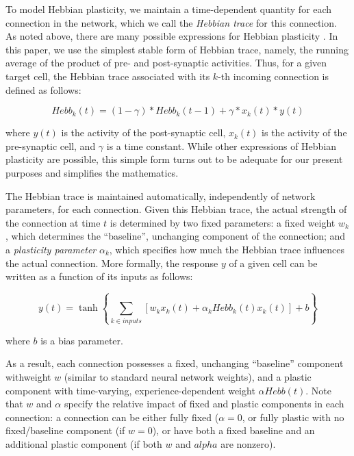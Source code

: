 \documentclass{article}
\begin{document}
To model Hebbian plasticity, we maintain a time-dependent quantity for each
connection in the network, which we call the \emph{Hebbian trace} for this
connection.  As noted above, there are many possible expressions for Hebbian
plasticity \cite{Vasilkoski2011-ww}.  In this paper, we use the simplest stable form of Hebbian trace,
namely, the running average of the product of pre- and post-synaptic
activities.  Thus, for a given target cell, the Hebbian trace associated with
its $k$-th incoming connection is defined as follows:

\begin{equation}
\label{eq:hebb}
Hebb_k(t) = (1-\gamma) * Hebb_k(t-1) + \gamma * x_k(t) * y(t)
\end{equation}

where $y(t)$ is the activity of the post-synaptic cell, $x_k(t)$ is the activity
of the pre-synaptic cell, and $\gamma$ is a time constant. While other
expressions of Hebbian plasticity are possible, this simple form turns out to be
adequate for our present purposes and simplifies the mathematics.

The Hebbian trace is maintained automatically, independently of network
parameters, for each connection. Given this Hebbian trace, the
actual strength of the connection at time $t$ is determined by two fixed parameters: a fixed
weight $w_k$, which determines the ``baseline'', unchanging component of the
connection; and a \emph{plasticity parameter} $\alpha_k$, which specifies how
much the Hebbian trace influences the actual connection. More formally, the
response $y$ of a given cell can be written as a function of its inputs as
follows:

\begin{equation}
\label{eq:y}
y(t) = \tanh\left\{\sum_{k \in inputs}[w_k x_k(t) + \alpha_k Hebb_k(t) x_k(t)] +
b\right\}
\end{equation}


where $b$ is a bias parameter. 

As a result, each connection possesses a fixed, unchanging ``baseline''
component withweight $w$ (similar to standard neural network weights), and a
plastic component with time-varying, experience-dependent weight $\alpha
Hebb(t)$. 
Note that $w$ and $\alpha$ specify the relative impact of fixed and plastic
components in each connection: a connection can be either fully fixed
($\alpha=0$, or fully plastic with no fixed/baseline component (if $w=0$), or
have both a fixed baseline and an additional plastic component (if both $w$ and
$alpha$ are nonzero).
\end{document}
